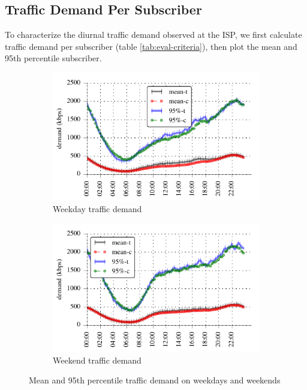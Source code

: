 \subsection{Traffic Demand Per Subscriber}\label{subsec:behavior}

To characterize the diurnal traffic demand observed at the ISP, we first 
calculate traffic demand per subscriber (table \ref{tab:eval-criteria}), then
plot the mean and 95th percentile subscriber.


\begin{figure}[t]
\begin{minipage}{1\linewidth}
\centering
%
\begin{subfigure}[b]{0.49\linewidth}
\includegraphics[width=\linewidth]{figures/weekday_demand_mean_perc95.pdf}
               \caption{Weekday traffic demand\label{fig:weekday-daily-usage}}
\end{subfigure}
%
\begin{subfigure}[b]{0.49\linewidth}
\includegraphics[width=\linewidth]{figures/weekend_demand_mean_perc95}
               \caption{Weekend traffic demand\label{fig:weekend-daily-usage}}
\end{subfigure}
%
\end{minipage}
\caption{Mean and 95th percentile traffic demand on weekdays and weekends}
\label{fig:traffic-demand-timeseries}
\end{figure}

